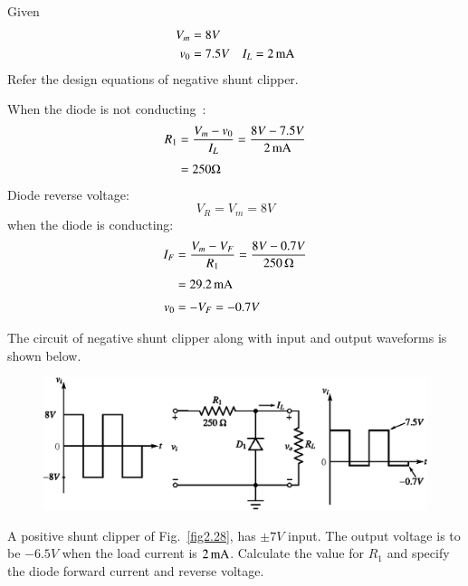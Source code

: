 \begin{solution}
Given
\begin{align*}
V_{m} &= 8V\\
v_{0} &=7.5V\quad I_{L}=2\operatorname{mA}
\end{align*}
Refer the design equations of negative shunt clipper. 

When the diode is not conducting~:
\begin{align*}
R_{1} &= \frac{V_{m}-v_{0}}{I_{L}}=\frac{8V-7.5V}{2\operatorname{mA}}\\[3pt]
&= 250\Omega
\end{align*}
Diode reverse voltage:
$$
V_{R}=V_{m}=8V
$$
when the diode is conducting:
\begin{align*}
I_{F} &= \frac{V_{m}-V_{F}}{R_{1}}=\frac{8V-0.7V}{250\,\Omega}\\[3pt]
&= 29.2\operatorname{mA}\\[3pt]
v_{0} &= -V_{F}=-0.7V
\end{align*}

The circuit of negative shunt clipper along with input and output waveforms is shown below.
\begin{figure}[H]
\centering
\includegraphics{chap2/sol2.40.eps}
\end{figure}
\end{solution}

\begin{example}\label{exam2.41}
A positive shunt clipper of Fig.~\ref{fig2.28}, has $\pm 7V$ input. The output voltage is to be $-6.5V$ when the load current is $2\operatorname{mA}$. Calculate the value for $R_{1}$ and specify the diode forward current and reverse voltage.
\end{example}

